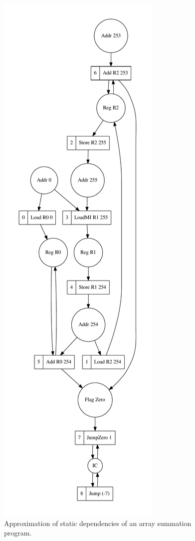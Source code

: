 \begin{figure}
\centerline{\includegraphics[scale=0.45]{img/sumArray.pdf}}
\caption{Approximation of static dependencies of an array summation program.\label{fig-sum}}
\end{figure}

